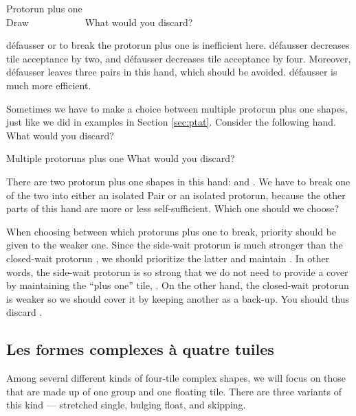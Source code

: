 {\begin{itembox}[r]{Protorun plus one}
\bp
{}~\\
\hfill\footnotesize{Draw~~~~~~~~~~~}
\ep
\vspace{-15pt}What would you discard? \vspace{-5pt}
\end{itembox}
\noindent
défausser {\LARGE{}} or {\LARGE{}} to break the protorun plus one {\LARGE{}} is inefficient here. défausser {\LARGE{}} decreases tile acceptance by two, and défausser {\LARGE{}} decreases tile acceptance by four. Moreover, défausser {\LARGE{}} leaves three pairs in this hand, which should be avoided. défausser {\LARGE{}} is much more efficient. 

\bigskip

Sometimes we have to make a choice between multiple protorun plus one shapes, just like we did in examples in Section \ref{sec:ptat}. 
Consider the following hand. What would you discard?
\begin{itembox}[r]{Multiple protoruns plus one}
\bp
{}\bei\bei
\ep
\vspace{-10pt}What would you discard? \vspace{-5pt}
\end{itembox}
\noindent
There are two protorun plus one shapes in this hand: {\LARGE{}} and {\LARGE{}}. We have to break one of the two into either an isolated Pair or an isolated protorun, because the other parts of this hand are more or less self-sufficient. Which one should we choose?

\bigskip
When choosing between which protoruns plus one to break, priority should be given to the weaker one. Since the side-wait protorun {\LARGE{}} is much stronger than the closed-wait protorun {\LARGE{}}, we should prioritize the latter and maintain {\LARGE{}}. In other words, the side-wait protorun {\LARGE{}} is so strong that we do not need to provide a cover by maintaining the ``plus one'' tile, {\LARGE{}}. On the other hand, the closed-wait protorun {\LARGE{}} is weaker so we should cover it by keeping another {\LARGE{}} as a back-up. You should thus discard {\LARGE{}}. 

\subsection{Les formes complexes à quatre tuiles} 
Among several different kinds of four-tile complex shapes, we will focus on those that are made up of one group and one floating tile. There are three variants of this kind --- stretched single, bulging float, and skipping.

}
